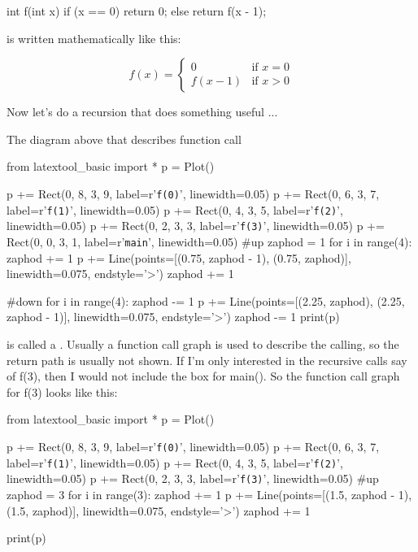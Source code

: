 \begin{consolethree}[escapeinside=||]
int f(int x)
{
    if (x == 0)
    {
        return 0;
    }
    else
    {
        return f(x - 1);
    }
}
\end{consolethree}

is written mathematically like this:

\[
f(x) = \begin{cases}
0 & \text{if } x = 0 \\
f(x - 1) & \text{if } x > 0
\end{cases}
\]

Now let's do a recursion that does something useful ...


\newpage{}

The diagram above that describes function call
\begin{python}
from latextool_basic import *
p = Plot()

p += Rect(0, 8, 3, 9, label=r'\texttt{f(0)}', linewidth=0.05)
p += Rect(0, 6, 3, 7, label=r'\texttt{f(1)}', linewidth=0.05)
p += Rect(0, 4, 3, 5, label=r'\texttt{f(2)}', linewidth=0.05)
p += Rect(0, 2, 3, 3, label=r'\texttt{f(3)}', linewidth=0.05)
p += Rect(0, 0, 3, 1, label=r'\texttt{main}', linewidth=0.05)
#up
zaphod = 1
for i in range(4):
    zaphod += 1
    p += Line(points=[(0.75, zaphod - 1), (0.75, zaphod)], linewidth=0.075, endstyle='>')
    zaphod += 1

#down
for i in range(4):
    zaphod -= 1
    p += Line(points=[(2.25, zaphod), (2.25, zaphod - 1)], linewidth=0.075, endstyle='>')
    zaphod -= 1
print(p)
\end{python}

is called a . Usually a function call graph
is used to describe the calling, so the return path is usually not
shown. If I'm only interested in the recursive calls say of f(3), then I
would not include the box for main(). So the function call graph for
f(3) looks like this:

\begin{python}
from latextool_basic import *
p = Plot()

p += Rect(0, 8, 3, 9, label=r'\texttt{f(0)}', linewidth=0.05)
p += Rect(0, 6, 3, 7, label=r'\texttt{f(1)}', linewidth=0.05)
p += Rect(0, 4, 3, 5, label=r'\texttt{f(2)}', linewidth=0.05)
p += Rect(0, 2, 3, 3, label=r'\texttt{f(3)}', linewidth=0.05)
#up
zaphod = 3
for i in range(3):
    zaphod += 1
    p += Line(points=[(1.5, zaphod - 1), (1.5, zaphod)], linewidth=0.075, endstyle='>')
    zaphod += 1

print(p)
\end{python}

